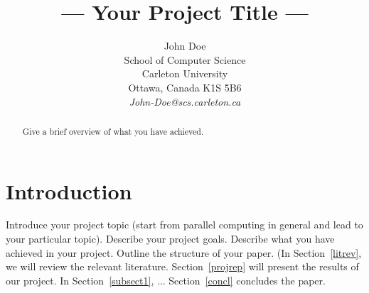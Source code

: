 \documentclass[11pt]{article}       %
\begin{document}


\title{--- Your Project Title ---}


\author{
John Doe\\
School of Computer Science\\
Carleton University\\
Ottawa, Canada K1S 5B6\\
{\em John-Doe@scs.carleton.ca}
} %

\maketitle

\begin{abstract}
Give a brief overview of what you have achieved.
\end{abstract}


\section{Introduction} \label{intro}

Introduce your project topic (start from parallel computing in
general and lead to your particular topic). Describe your project
goals. Describe what you have achieved in your project. Outline
the structure of your paper. (In Section~\ref{litrev}, we will
review the relevant literature. Section~\ref{projrep} will present
the results of our project. In Section~\ref{subsect1}, ...
Section~\ref{concl} concludes the paper.


\end{document}
